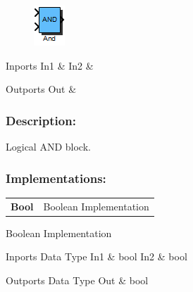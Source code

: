 \label{block:And}
\begin{figure}[H]\includegraphics{And}\end{figure} 

\begin{XtoCtabular}{Inports}
In1 & \tabularnewline
\hline
In2 & \tabularnewline
\hline
\end{XtoCtabular}


\begin{XtoCtabular}{Outports}
Out & \tabularnewline
\hline
\end{XtoCtabular}

\subsubsection*{Description:}
Logical AND block.

\subsubsection*{Implementations:}
\begin{tabular}{l l}
\textbf{Bool} & Boolean Implementation\tabularnewline
\end{tabular}

\nopagebreak[0]

Boolean Implementation

\begin{XtoCtabular}{Inports Data Type}
In1 & bool\tabularnewline
\hline
In2 & bool\tabularnewline
\hline
\end{XtoCtabular}

\begin{XtoCtabular}{Outports Data Type}
Out & bool\tabularnewline
\hline
\end{XtoCtabular}

\ifdefined \AddTestReports
{}
\fi
